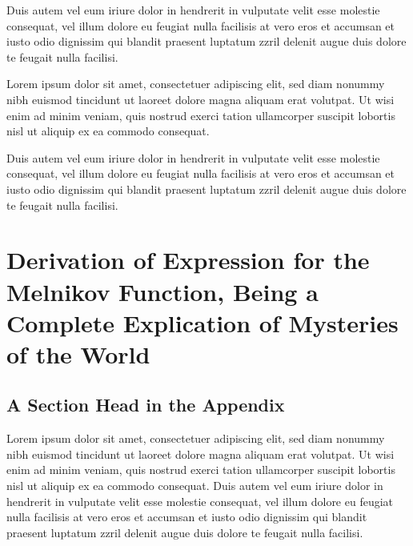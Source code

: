 \documentclass[oldfontcommands,6x9]{pupbook}
\begin{document}
Duis autem vel eum iriure dolor in hendrerit in vulputate velit esse
molestie consequat, vel illum dolore eu feugiat nulla facilisis at vero
eros et accumsan et iusto odio dignissim qui blandit praesent luptatum
zzril delenit augue duis dolore te feugait nulla facilisi. 


\begin{corollary}
Lorem ipsum
dolor sit amet, consectetuer adipiscing elit, sed diam nonummy nibh
euismod tincidunt ut laoreet dolore magna aliquam erat volutpat. Ut wisi
enim ad minim veniam, quis nostrud exerci tation ullamcorper suscipit
lobortis nisl ut aliquip ex ea commodo consequat. 
\end{corollary}


Duis autem vel eum iriure dolor in hendrerit in vulputate velit esse
molestie consequat, vel illum dolore eu feugiat nulla facilisis at vero
eros et accumsan et iusto odio dignissim qui blandit praesent luptatum
zzril delenit augue duis dolore te feugait nulla facilisi. 

\appendix


\chapter*[Melnikov]{Derivation of Expression for the Melnikov Function, Being a Complete Explication of Mysteries of the World}

\section{A Section Head in the Appendix}

Lorem ipsum dolor sit amet, consectetuer adipiscing elit, sed diam
nonummy nibh euismod tincidunt ut laoreet dolore magna aliquam erat
volutpat. Ut wisi enim ad minim veniam, quis nostrud exerci tation
ullamcorper suscipit lobortis nisl ut aliquip ex ea commodo consequat.
Duis autem vel eum iriure dolor in hendrerit in vulputate velit esse
molestie consequat, vel illum dolore eu feugiat nulla facilisis at vero
eros et accumsan et iusto odio dignissim qui blandit praesent luptatum
zzril delenit augue duis dolore te feugait nulla facilisi. 
\end{document}
